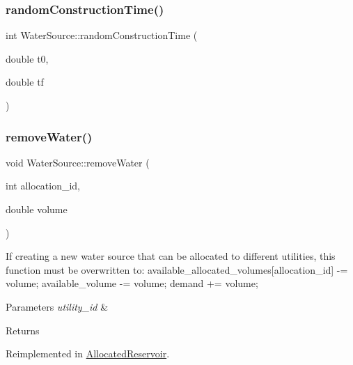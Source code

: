 \subsubsection{\texorpdfstring{random\+Construction\+Time()}{randomConstructionTime()}}
{\footnotesize\ttfamily int Water\+Source\+::random\+Construction\+Time (\begin{DoxyParamCaption}\item[{double}]{t0,  }\item[{double}]{tf }\end{DoxyParamCaption})}

\mbox{\label{classWaterSource_ab697c3a0765d445f72533f6a5f139bd9}} 
\subsubsection{\texorpdfstring{remove\+Water()}{removeWater()}}
{\footnotesize\ttfamily void Water\+Source\+::remove\+Water (\begin{DoxyParamCaption}\item[{int}]{allocation\+\_\+id,  }\item[{double}]{volume }\end{DoxyParamCaption})\hspace{0.3cm}{\ttfamily [virtual]}}

If creating a new water source that can be allocated to different utilities, this function must be overwritten to\+: available\+\_\+allocated\+\_\+volumes\mbox{[}allocation\+\_\+id\mbox{]} -\/= volume; available\+\_\+volume -\/= volume; demand += volume; 
\begin{DoxyParams}{Parameters}
{\em utility\+\_\+id} & \\
\hline
\end{DoxyParams}
\begin{DoxyReturn}{Returns}

\end{DoxyReturn}


Reimplemented in \mbox{\hyperlink{classAllocatedReservoir_a3a9b7ce2e1d42cc373095cfd40ef2ae2}{Allocated\+Reservoir}}.

\mbox{\label{classWaterSource_af52f39412f0d761f7e3b3369ffdf90f1}} 
